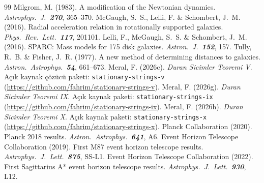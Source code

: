 \documentclass[12pt,a4paper]{article}
\begin{document}
\begin{thebibliography}{99}
     Milgrom, M. (1983). A modification of the Newtonian dynamics.
    \textit{Astrophys.\ J.\ \textbf{270}}, 365--370.
     McGaugh, S.~S., Lelli, F. \& Schombert, J.~M. (2016).
    Radial acceleration relation in rotationally supported galaxies.
    \textit{Phys.\ Rev.\ Lett.\ \textbf{117}}, 201101.
     Lelli, F., McGaugh, S.~S. \& Schombert, J.~M. (2016).
    SPARC: Mass models for 175 disk galaxies.
    \textit{Astron.\ J.\ \textbf{152}}, 157.
     Tully, R.~B. \& Fisher, J.~R. (1977). A new method of
    determining distances to galaxies. \textit{Astron.\ Astrophys.\ \textbf{54}}, 661--673.
     Meral, F. (2026c). \textit{Duran Sicimler Teoremi V}.
    Açık kaynak çözücü paketi: \texttt{stationary-strings-v}
    (\url{https://github.com/fahrim/stationary-strings-v}).
     Meral, F. (2026g). \textit{Duran Sicimler Teoremi IX}.
    Açık kaynak paketi: \texttt{stationary-strings-ix}
    (\url{https://github.com/fahrim/stationary-strings-ix}).
     Meral, F. (2026h). \textit{Duran Sicimler Teoremi X}.
    Açık kaynak paketi: \texttt{stationary-strings-x}
    (\url{https://github.com/fahrim/stationary-strings-x}).
     Planck Collaboration (2020). Planck 2018 results.
    \textit{Astron.\ Astrophys.\ \textbf{641}}, A6.
     Event Horizon Telescope Collaboration (2019).
    First M87 event horizon telescope results. \textit{Astrophys.\ J.\ Lett.\
    \textbf{875}}, SS-L1.
     Event Horizon Telescope Collaboration (2022).
    First Sagittarius A* event horizon telescope results.
    \textit{Astrophys.\ J.\ Lett.\ \textbf{930}}, L12.
\end{thebibliography}
\end{document}
